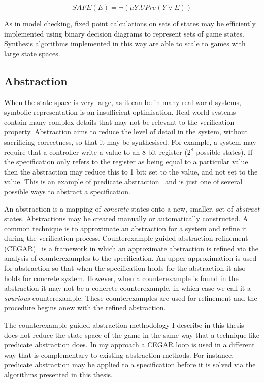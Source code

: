 $$ SAFE(E) = \lnot(\mu Y . UPre( Y \lor E )) $$

As in model checking, fixed point calculations on sets of states may be efficiently implemented using binary decision diagrams to represent sets of game states. Synthesis algorithms implemented in this way are able to scale to games with large state spaces.

\subsection{Abstraction}

When the state space is very large, as it can be in many real world systems, symbolic representation is an insufficient optimisation. Real world systems contain many complex details that may not be relevant to the verification property. Abstraction aims to reduce the level of detail in the system, without sacrificing correctness, so that it may be synthesised. For example, a system may require that a controller write a value to an 8 bit register ($2^8$ possible states). If the specification only refers to the register as being equal to a particular value then the abstraction may reduce this to 1 bit: set to the value, and not set to the value. This is an example of predicate abstraction~\cite{Graf97} and is just one of several possible ways to abstract a specification.

An abstraction is a mapping of \emph{concrete} states onto a new, smaller, set of  \emph{abstract} states. Abstractions may be created manually or automatically constructed. A common technique is to approximate an abstraction for a system and refine it during the verification process. Counterexample guided abstraction refinement (CEGAR)~\cite{Clarke00} is a framework in which an approximate abstraction is refined via the analysis of counterexamples to the specification. An upper approximation is used for abstraction so that when the specification holds for the abstraction it also holds for concrete system. However, when a counterexample is found in the abstraction it may not be a concrete counterexample, in which case we call it a \emph{spurious} counterexample. These counterexamples are used for refinement and the procedure begins anew with the refined abstraction.

The counterexample guided abstraction methodology I describe in this thesis does not reduce the state space of the game in the same way that a technique like predicate abstraction does. In my approach a CEGAR loop is used in a different way that is complementary to existing abstraction methods. For instance, predicate abstraction may be applied to a specification before it is solved via the algorithms presented in this thesis.

